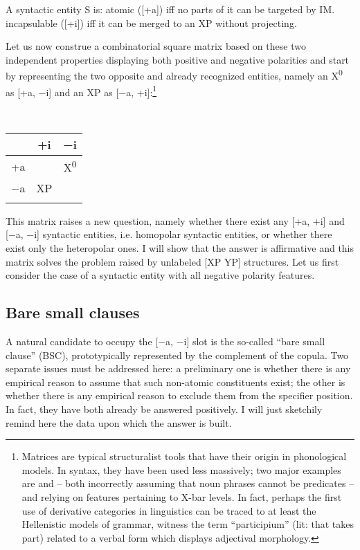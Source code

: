 \documentclass[output=paper]{langsci/langscibook}
\begin{document}
\ea A syntactic entity S is:
\label{ex:key:28.1}
	\ea atomic ([+a]) iff no parts of it can be targeted by \gls{IM}.
	\ex incapsulable ([+i]) iff it can be merged to an XP without projecting.
	\z
\z

Let us now construe a combinatorial square matrix based on these two
independent properties displaying both positive and negative polarities and
start by representing the two opposite and already recognized entities, namely
an X\textsuperscript{0} as [+a, −i] and  an XP as [−a, +i]:\footnote{Matrices
    are typical structuralist tools that have their origin in phonological
    models.  In syntax, they have been used less massively; two major examples
    are  and \citet{Jackendoff1977} -- both incorrectly
    assuming that noun phrases cannot be predicates -- and
    \citealt{MuyskenvanRiemsdijk1986} relying on features pertaining to X-bar
    levels. In fact, perhaps the first use of derivative categories in
    linguistics can be traced to at least the Hellenistic models of grammar,
witness the term “participium” (lit: that takes part) related to a verbal form
which displays adjectival morphology.}

\ea\label{ex:key:28.2}\leavevmode\\[-1\baselineskip]
    \begin{tabular}{ccc}
    \lsptoprule
    	        & +i & −i\\
    \midrule
    +a &             & X\textsuperscript{0}\\
    −a & XP          & \\
    \lspbottomrule
    \end{tabular}
\z

This matrix raises a new question, namely whether there exist any [+a, +i] and
[−a, −i] syntactic entities, i.e. homopolar syntactic entities, or whether
there exist only the heteropolar ones. I will show that the answer is
affirmative and this matrix solves the problem raised by unlabeled [XP YP]
structures.  Let us first consider the case of a syntactic entity with all
negative polarity features.

\subsection{Bare small clauses}

A natural candidate to occupy the [−a, −i] slot is the so-called “bare small
clause” (\gls{BSC}), prototypically represented by the complement
of the copula. Two separate issues must be addressed here: a preliminary one is
whether there is any empirical reason to assume that such non-atomic
constituents exist; the other is whether there is any empirical reason to
exclude them from the specifier position. In fact, they have both already be
answered positively.  I will just sketchily remind here the data upon which the
answer is built.\largerpage
\end{document}

